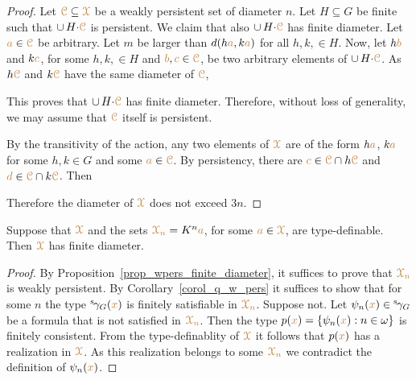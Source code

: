 \begin{proof}
  Let ${\color{brown}\EuScript C}\subseteq{\color{brown}\EuScript X}$ be a weakly persistent set of diameter $n$.
  Let $H\subseteq G$ be finite such that $\cup\,H{\cdot}{\color{brown}\EuScript C}$ is persistent.
  We claim that also $\cup\,H{\cdot}{\color{brown}\EuScript C}$ has finite diameter.
  Let ${\color{brown} a}\in{\color{brown}\EuScript C}$ be arbitrary.
  Let $m$ be larger than $d(h{\color{brown} a}, k{\color{brown} a})$ for all $h,k,\in H$.
  Now, let $h{\color{brown} b}$ and $k{\color{brown} c}$, for some $h,k,\in H$ and ${\color{brown} b},{\color{brown} c}\in{\color{brown}\EuScript C}$, be two arbitrary elements of $\cup\,H{\cdot}{\color{brown}\EuScript C}$.
  As $h{\color{brown}\EuScript C}$ and $k{\color{brown}\EuScript C}$ have the same diameter of ${\color{brown}\EuScript C}$, 



  This proves that $\cup\,H{\cdot}{\color{brown}\EuScript C}$ has finite diameter.
  Therefore, without loss of generality, we may assume that ${\color{brown}\EuScript C}$ itself is persistent.
  
  By the transitivity of the action, any two elements of ${\color{brown}\EuScript X}$ are of the form $h{\color{brown} a}$, $k{\color{brown} a}$ for some $h,k\in G$ and some ${\color{brown} a}\in{\color{brown}\EuScript C}$.
  By persistency, there are ${\color{brown} c}\in{\color{brown}\EuScript C}\cap h{\color{brown}\EuScript C}$ and ${\color{brown} d}\in{\color{brown}\EuScript C}\cap k{\color{brown}\EuScript C}$.
  Then 



  Therefore the diameter of ${\color{brown}\EuScript X}$ does not exceed $3n$.
\end{proof}

\begin{theorem}\label{thm_newelski}
  Suppose that ${\color{brown}\EuScript X}$ and the sets ${\color{brown}\EuScript X_n}=K^n{\color{brown} a}$, for some ${\color{brown} a}\in{\color{brown}\EuScript X}$, are type-definable.
  Then ${\color{brown}\EuScript X}$ has finite diameter.
\end{theorem}

\begin{proof}
  By Proposition~\ref{prop_wpers_finite_diameter}, it suffices to prove that ${\color{brown}\EuScript X_n}$ is weakly persistent.
  By Corollary~\ref{corol_q_w_pers} it suffices to show that for some $n$ the type ${}^{\rm s}\kern-.2ex\gamma_G({\color{brown} x})$ is finitely satisfiable in ${\color{brown}\EuScript X_n}$.
  Suppose not.
  Let $\psi_n({\color{brown} x})\in{}^{\rm s}\kern-.2ex\gamma_G$ be a formula that is not satisfied in $\color{brown}\EuScript X_n$.
  Then the type $p({\color{brown} x})=\{\psi_n({\color{brown} x}):n\in\omega\}$ is finitely consistent.
  From the type-definablity of ${\color{brown}\EuScript X}$ it follows that $p({\color{brown} x})$ has a realization in ${\color{brown}\EuScript X}$.
  As this realization belongs to some ${\color{brown}\EuScript X_n}$ we contradict the definition of $\psi_n({\color{brown} x})$.
\end{proof}

